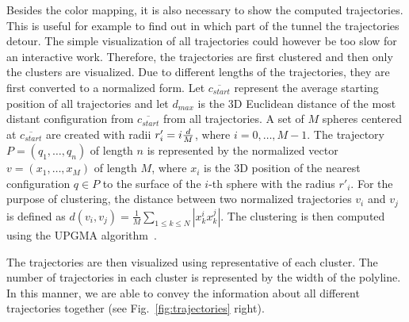 \documentclass{svmult}
\begin{document}
\def\cstart{\overline{c_{start}}}
\def\cend{\overline{c_{end}}}

Besides the color mapping, it is also necessary to show the computed trajectories.
This is useful for example to find out in which part of the tunnel the trajectories detour.
The simple visualization of all trajectories could however be too slow for an interactive work.
Therefore, the trajectories are first clustered and then only the clusters are visualized.
Due to different lengths of the trajectories, they are first converted to a normalized form.
Let $\cstart$ represent the average starting position of all trajectories and let $d_{max}$ is the 3D Euclidean distance
of the most distant configuration from $\cstart$ from all trajectories.
A set of $M$ spheres centered at $\cstart$ are created with radii $r'_i=i {d \over M}$, where $i=0,\ldots, M-1$.
The trajectory $P=(q_1,\ldots,q_n)$ of length $n$ is represented by the normalized vector $v=(x_1,\ldots,x_M)$ of length $M$,
where $x_i$ is the 3D position of the nearest configuration $q \in P$ to the surface of the $i$-th sphere with the radius $r'_i$.
For the purpose of clustering, the distance between two normalized trajectories $v_i$ and $v_j$ is defined as
$d(v_i, v_j) = \frac{1}{M} \sum_{1 \leq k \leq N} |x_k^i x_k^j|$.
The clustering is then computed using the UPGMA algorithm~\cite{sokal1958statistical}.

The trajectories are then visualized using representative of each cluster.
The number of trajectories in each cluster is represented by the width of the polyline.
In this manner, we are able to convey the information about all different trajectories together (see Fig.~\ref{fig:trajectories} right).
\end{document}
